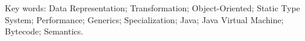 \vspace{0.7em}


Key words:
Data Representation; Transformation; Object-Oriented; Static Type System; Performance; Generics; Specialization; Java; Java Virtual Machine; Bytecode; Semantics.








